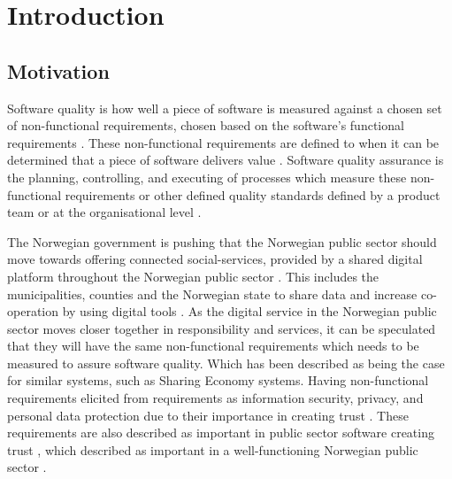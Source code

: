 \chapter{Introduction}

\section{Motivation} \label{sec:motivation}

Software quality is how well a piece of software is measured against a chosen set of non-functional requirements, chosen based on the software's functional requirements \cite{iso_25010:2011}. These non-functional requirements are defined to when it can be determined that a piece of software delivers value \cite{iso_25010:2011}. Software quality assurance is the planning, controlling, and executing of processes which measure these non-functional requirements or other defined quality standards defined by a product team or at the organisational level \cite{ieee_730_2014}\cite{sqa_wiki_2023}. 



The Norwegian government is pushing that the Norwegian public sector should move towards offering connected social-services, provided by a shared digital platform throughout the Norwegian public sector \cite{r_2019}. This includes the municipalities, counties and the Norwegian state to share data and increase co-operation by using digital tools \cite{r_2019}. As the digital service in the Norwegian public sector moves closer together in responsibility and services, it can be speculated that they will have the same non-functional requirements which needs to be measured to assure software quality. Which has been described as being the case for similar systems, such as Sharing Economy systems. Having non-functional requirements elicited from requirements as information security, privacy, and personal data protection due to their importance in creating trust \cite{is_2019}. These requirements are also described as important in public sector software creating trust \cite{la_2017}, which described as important in a well-functioning Norwegian public sector \cite{oecd_2022}.

